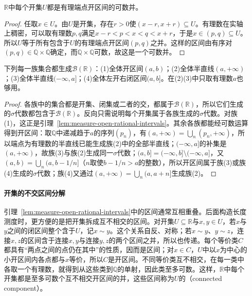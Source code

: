 \begin{lemma}[开集的有理区间表示]
\label{lem:measure-open-rational-intervals}
$\mathbb R$中每个开集$U$都是有理端点开区间的可数并。
\end{lemma}

\begin{proof}
任取$x\in U$。由$U$是开集，存在$r>0$使$(x-r,x+r)\subseteq U$。有理数在实轴上稠密，可以取有理数$p,q$满足$x-r<p<x<q<x+r$，于是$x\in(p,q)\subseteq U$。所以$U$等于所有包含于$U$的有理端点开区间$(p,q)$之并。这样的区间由有序对$(p,q)\in\mathbb Q\times\mathbb Q$确定，而$\mathbb Q\times\mathbb Q$可数，故这是一个可数并。
\end{proof}

\begin{theorem}
\label{thm:measure-borel-generators}
下列每一族集合都生成$\mathcal B(\mathbb R)$：(1)全体开区间$(a,b)$；(2)全体半直线$(a,+\infty)$；(3)全体半直线$(-\infty,a]$；(4)全体左开右闭区间$(a,b]$。在(2)(3)中只取有理数$a$也够用。
\end{theorem}

\begin{proof}
各族中的集合都是开集、闭集或二者的交，都属于$\mathcal B(\mathbb R)$，所以它们生成的$\sigma$代数都包含于$\mathcal B(\mathbb R)$。反向只需说明每个开集属于各族生成的$\sigma$代数。对族(1)，这正是引理~\ref{lem:measure-open-rational-intervals}。其余各族都能经可数运算得到开区间：取$\mathbb Q$中递减趋于$a$的序列$(p_n)$，有$(a,+\infty)=\bigcup_n(p_n,+\infty)$，所以端点为有理数的半直线已能生成族(2)中的全部半直线；$(-\infty,a]$的补集是$(a,+\infty)$，故族(3)与族(2)生成同一$\sigma$代数；$(a,b]=(-\infty,b]\setminus(-\infty,a]$，又$(a,b)=\bigcup_{n}(a,b-1/n]$（$n$取使$b-1/n>a$的整数），所以开区间属于族(3)或族(4)生成的$\sigma$代数；族(4)又通过$(a,+\infty)=\bigcup_n(a,a+n]$生成族(2)。
\end{proof}

\paragraph{开集的不交区间分解}
引理~\ref{lem:measure-open-rational-intervals}中的区间通常互相重叠。后面构造长度测度时，更方便的是把开集拆成互不相交的区间。对开集$U\subseteq\mathbb R$与$x,y\in U$，若$x$与$y$之间的闭区间整个含于$U$，记$x\sim y$。这个关系自反、对称；若$x\sim y$、$y\sim z$，连接$x,z$的区间含于连接$x,y$与连接$y,z$的两个区间之并，所以也传递。每个等价类$C$都具有“两点之间的点仍在其中”的性质，因而是区间；对$x\in C$，$U$中以$x$为中心的小开区间内各点都与$x$等价，所以$C$是开区间。不同等价类互不相交，在每一类中各取一个有理数，就得到从这些类到$\mathbb Q$的单射，因此类至多可数。这样，$\mathbb R$中每个开集都是至多可数个互不相交开区间的并，这些区间称为$U$的（connected component）。


